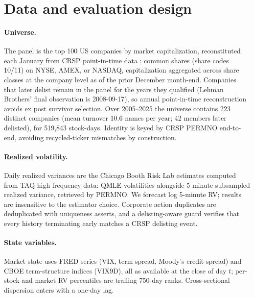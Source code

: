 \section{Data and evaluation design}\label{sec:data}

\paragraph{Universe.} The panel is the top 100 US companies by market
capitalization, reconstituted each January from CRSP point-in-time data
\citep{crsp}:
common shares (share codes 10/11) on NYSE, AMEX, or NASDAQ, capitalization
aggregated across share classes at the company level as of the prior
December month-end. Companies that later delist remain in the panel for
the years they qualified (Lehman Brothers' final observation is
2008-09-17), so annual point-in-time reconstruction avoids ex post
survivor selection. Over
2005--2025 the universe contains 223 distinct companies (mean turnover
10.6 names per year; 42 members later delisted), for 519{,}843 stock-days.
Identity is keyed by CRSP PERMNO end-to-end, avoiding recycled-ticker
mismatches by construction.

\paragraph{Realized volatility.} Daily realized variances are the Chicago
Booth Risk Lab estimates \citep{risklab} computed from TAQ
high-frequency data: QMLE
volatilities \citep{xiu2010quasi, da2021moving} alongside 5-minute
subsampled realized variance, retrieved by PERMNO. We forecast log
5-minute RV; results are insensitive to the estimator choice. Corporate
action duplicates are deduplicated with uniqueness asserts, and a
delisting-aware guard verifies that every history terminating early
matches a CRSP delisting event.

\paragraph{State variables.} Market state uses FRED series \citep{fred}
(VIX, term spread, Moody's credit spread) and CBOE term-structure
indices \citep{cboe} (VIX9D), all as available at the close of day $t$; per-stock and market RV
percentiles are trailing 750-day ranks. Cross-sectional dispersion enters
with a one-day lag.

